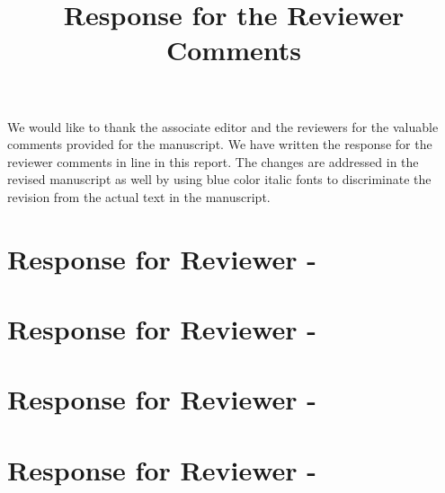 \documentclass[10pt,letterpaper,onecolumn]{IEEEtran}
\begin{document}
\doublespacing

\title{Response for the Reviewer Comments}

\maketitle

We would like to thank the associate editor and the reviewers for the valuable comments provided for the manuscript. We have written the response for the reviewer comments in line in this report. The changes are addressed in the revised manuscript as well by using blue color italic fonts to discriminate the revision from the actual text in the manuscript. 

\newpage
\section*{Response for Reviewer - }


\newpage
\section*{Response for Reviewer - }


\newpage
\section*{Response for Reviewer - }


\newpage
\section*{Response for Reviewer - }

\end{document}
